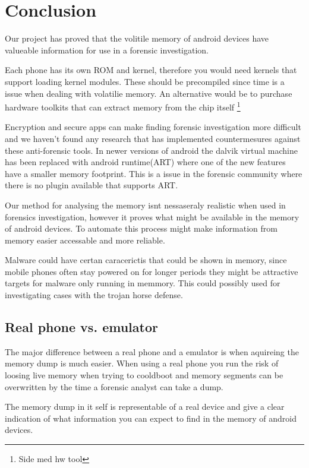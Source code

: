 \section{Conclusion}
Our project has proved that the volitile memory of android devices have valueable information for use 
in a forensic investigation.

Each phone has its own ROM and kernel, therefore you would need kernels that support loading kernel 
modules. These should be precompiled since time is a issue when dealing with volatilie memory. An 
alternative would be to purchase hardware toolkits that can extract memory from the chip itself 
\footnote{Side med hw tool}

Encryption and secure apps can make finding forensic investigation more difficult and we haven't found 
any research that has implemented countermesures against these anti-forensic tools. In newer versions 
of android the dalvik virtual machine has been replaced with android runtime(ART) where one of the new 
features have a smaller memory footprint. This is a issue in the forensic community where there is no 
plugin available that supports ART.

Our method for analysing the memory isnt nessaseraly realistic when used in forensics investigation, however it proves what might be available in the memory of android devices. To automate this process might make information from memory easier accessable and more reliable.

Malware could have certan caracerictis that could be shown in memory, since mobile phones often stay 
powered on for longer periods they might be attractive targets for malware only running in memmory. 
This could possibly used for investigating cases with the trojan horse defense.

\subsection{Real phone vs. emulator}
The major difference between a real phone and a emulator is when aquireing the memory dump is much 
easier. When using a real phone you run the risk of loosing live memory when trying to cooldboot and 
memory segments can be overwritten by the time a forensic analyst can take a dump.

The memory dump in it self is representable of a real device and give a clear indication of what 
information you can expect to find in the memory of android devices.




